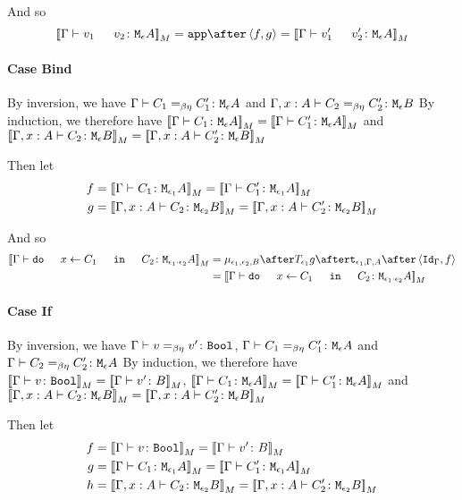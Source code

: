 \documentclass{report}
\begin{document}
    And so
    \begin{equation}
        \deno{\gtyperelation{\apply{v_1}{v_2}}{\M{\e}{A}}} = \app\after\pr{f}{g} = \deno{\gtyperelation{\apply{v_1'}{v_2'}}{\M{\e}{A}}}
    \end{equation}


    \paragraph{Case Bind}
    By inversion, we have $\Gamma \vdash C_1 =_{\beta\eta} C_1' \colon \texttt{M}_{\epsilon}{A}$ and $\Gamma, x: A \vdash C_2 =_{\beta\eta} C_2' \colon \texttt{M}_{\epsilon}{B}$
    By induction, we therefore have ${\bf [\![}\Gamma \vdash C_1 \colon \texttt{M}_{\epsilon}{A}{\bf ]\!]}_M= {\bf [\![}\Gamma \vdash C_1' \colon \texttt{M}_{\epsilon}{A}{\bf ]\!]}_M$ and ${\bf [\![}\Gamma, x: A \vdash C_2 \colon \texttt{M}_{\epsilon}{B}{\bf ]\!]}_M = {\bf [\![}\Gamma, x: A \vdash C_2' \colon \texttt{M}_{\epsilon}{B}{\bf ]\!]}_M$

    Then let
    \begin{align}
        f &{}=\deno{\gtyperelation{C_1}{\M{\e_1}{A}}}= \deno{\gtyperelation{C_1'}{\M{\e_1}{A}}}\\
        g &{}=\deno{\typerelation{\gax}{C_2}{\M{\e_2}{B}}} = \deno{\typerelation{\gax}{C_2'}{\M{\e_2}{B}}}
    \end{align}



    And so
    \begin{equation}
        \begin{split}
            \deno{\gtyperelation{\doin{x}{C_1}{C_2}}{\M{\e_1\dot\e_2}{A}}} & = \bind{\e_1}{\e_2}{B} \after \T{\e_1}{g} \after \tstrength{\e_1}{\G}{A} \after \pr{\idg}{f}\\
             & = \deno{\gtyperelation{\doin{x}{C_1}{C_2}}{\M{\e_1\dot\e_2}{A}}}
        \end{split}
    \end{equation}
    \paragraph{Case If}
    By inversion, we have $\Gamma \vdash v =_{\beta\eta} v' \colon \texttt{Bool}$, $\Gamma \vdash C_1 =_{\beta\eta} C_1' \colon \texttt{M}_{\epsilon}{A}$ and $\Gamma \vdash C_2 =_{\beta\eta} C_2' \colon \texttt{M}_{\epsilon}{A}$
    By induction, we therefore have ${\bf [\![}\Gamma \vdash v \colon \texttt{Bool}{\bf ]\!]}_M = {\bf [\![}\Gamma \vdash v' \colon B{\bf ]\!]}_M$, ${\bf [\![}\Gamma \vdash C_1 \colon \texttt{M}_{\epsilon}{A}{\bf ]\!]}_M= {\bf [\![}\Gamma \vdash C_1' \colon \texttt{M}_{\epsilon}{A}{\bf ]\!]}_M$ and ${\bf [\![}\Gamma, x: A \vdash C_2 \colon \texttt{M}_{\epsilon}{B}{\bf ]\!]}_M = {\bf [\![}\Gamma, x: A \vdash C_2' \colon \texttt{M}_{\epsilon}{B}{\bf ]\!]}_M$

    Then let
    \begin{align}
        f &{}=\deno{\gtyperelation{v}{\B}} = \deno{\gtyperelation{v'}{B}}\\
        g &{}=\deno{\gtyperelation{C_1}{\M{\e_1}{A}}}= \deno{\gtyperelation{C_1'}{\M{\e_1}{A}}}\\
        h &{}=\deno{\typerelation{\gax}{C_2}{\M{\e_2}{B}}} = \deno{\typerelation{\gax}{C_2'}{\M{\e_2}{B}}}
    \end{align}
\end{document}
